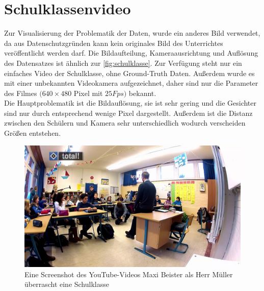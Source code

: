 \section{Schulklassenvideo}
\label{Schulvideo}
Zur Visualisierung der Problematik der Daten, wurde ein anderes Bild verwendet, da aus Datenschutzgründen kann kein originales Bild des Unterrichtes veröffentlicht werden darf. Die Bildaufteilung, Kameraausrichtung und Auflösung des Datensatzes ist ähnlich zur \autoref{fig:schulklasse}. Zur Verfügung steht nur ein einfaches Video der Schulklasse, ohne Ground-Truth Daten. Außerdem wurde es mit einer unbekannten Videokamera aufgezeichnet, daher sind nur die Parameter des Filmes $(640 \times 480$ Pixel mit $25Fps)$ bekannt.\\
Die Hauptproblematik ist die Bildauflösung, sie ist sehr gering und die Gesichter sind nur durch entsprechend wenige Pixel dargestellt. Außerdem ist die Distanz zwischen den Schülern und Kamera sehr unterschiedlich wodurch verscheiden Größen entstehen.\\
\begin{figure}
	\centering
	\includegraphics[width=0.8\linewidth]{img/Schulklasse}
	\caption{Eine Screenshot des YouTube-Videos \glqq Maxi Beister als Herr Müller überrascht eine Schulklasse\grqq \cite{Schulklasse_Video}}
	\label{fig:schulklasse}
\end{figure}
